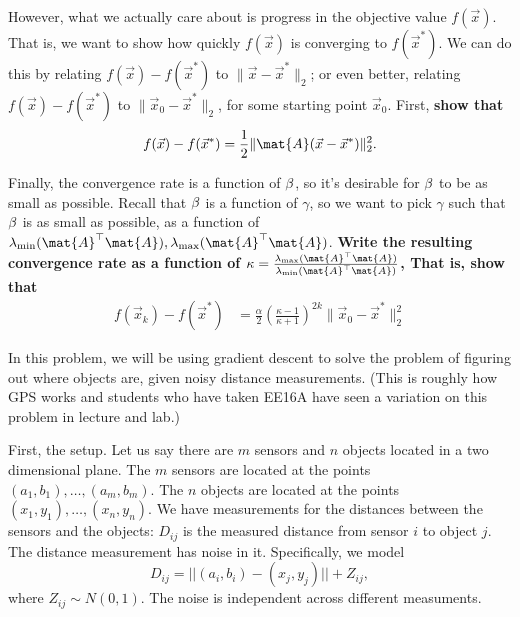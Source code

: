 \documentclass[preview]{standalone}
\begin{document}
\begin{Parts}
\Part  However, what we actually care about is progress in the
objective value $f(\vec{x})$. That is, we want to show how quickly $f(\vec{x})$
is converging to $f(\vec{x}^*)$. We can do this by relating $f(\vec{x})-f(\vec{x}^*)$ to
$\|\vec{x}-\vec{x}^*\|_2$; or even better,
relating $f(\vec{x})-f(\vec{x}^*)$ to $\|\vec{x}_0-\vec{x}^*\|_2$,
for some starting point $\vec{x}_0$. First, \textbf{show that}
\begin{align*}
f(\vec{x}) - f(\vec{x}^*) = \frac{1}{2}\|\mat{A} (\vec{x}-\vec{x}^*)\|_2^2.
\end{align*}






\Part Finally, the convergence rate is a function of $\beta$, so it's desirable
for $\beta$ to be as small as possible. Recall that $\beta$ is a function of $\gamma$,
so we want to pick $\gamma$ such that $\beta$ is as small as possible, as a function of
$\lambda_{\min}(\mat{A}^\top\mat{A}), \lambda_{\max}(\mat{A}^\top\mat{A})$.
\textbf{Write the resulting convergence rate as a function of
$\kappa = \frac{\lambda_{\max}(\mat{A}^\top\mat{A})}{\lambda_{\min}(\mat{A}^\top\mat{A})}$,
That is, show that}
\begin{align*}
	f(\vec{x}_k) - f(\vec{x}^*) &= \frac{\alpha}{2} \left(\frac{\kappa - 1}{\kappa + 1}\right)^{2k} \|\vec{x}_0-\vec{x}^*\|_2^2
\end{align*}




\end{Parts}

In this problem, we will be using gradient descent to solve the
problem of figuring out where objects are, given noisy distance
measurements. (This is roughly how GPS works and students who have
taken EE16A have seen a variation on this problem in lecture and
lab.)

First, the setup. Let us say there are $m$ sensors and $n$ objects
located in a two dimensional plane. The $m$ sensors are located at the points
$(a_1,b_1),\ldots,(a_m,b_m)$. The $n$ objects are located at the
points $(x_1,y_1),\ldots,(x_n,y_n)$. We have measurements for the
distances between the sensors and the objects: $D_{ij}$ is the
measured distance from sensor $i$ to object $j$. The distance
measurement has noise in it. Specifically, we model $$D_{ij} = ||(a_i,
b_i)-(x_j,y_j)||+Z_{ij},$$ where $Z_{ij} \sim N(0, 1)$. The noise is
independent across different measuments.
\end{document}
